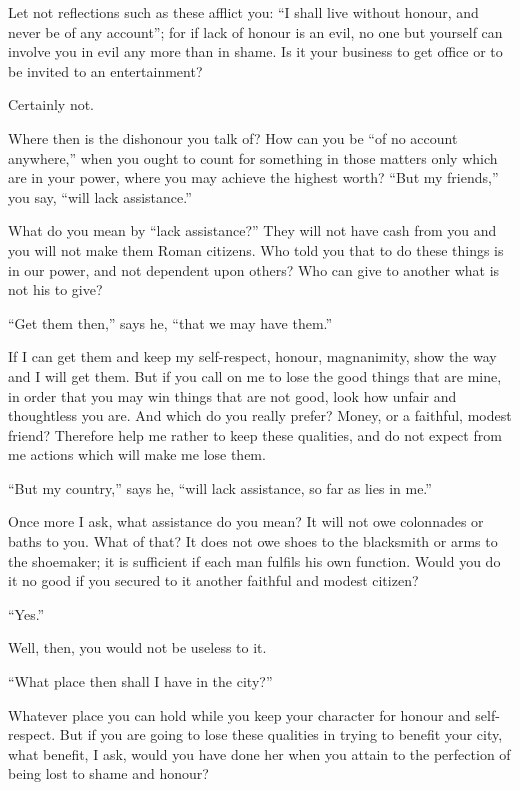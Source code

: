 Let not reflections  such as these afflict you: ``I  shall live without honour,
and never  be of any account'';  for if lack of  honour is an evil,  no one but
yourself can involve you in evil any more than in shame. Is it your business to
get office or to be invited to an entertainment?

Certainly not.

Where  then is  the dishonour  you talk  of?  How can  you be  ``of no  account
anywhere,'' when you  ought to count for something in  those matters only which
are in your power, where you may achieve the highest worth? ``But my friends,''
you say, ``will lack assistance.''

What do you mean  by ``lack assistance?'' They will not have  cash from you and
you will not make them Roman citizens. Who  told you that to do these things is
in our power,  and not dependent upon  others? Who can give to  another what is
not his to give?

``Get them then,'' says he, ``that we may have them.''

If I can get  them and keep my self-respect, honour,  magnanimity, show the way
and I will  get them. But if  you call on me  to lose the good  things that are
mine, in order that  you may win things that are not good,  look how unfair and
thoughtless you  are. And  which do  you really prefer?  Money, or  a faithful,
modest friend?  Therefore help me  rather to keep  these qualities, and  do not
expect from me actions which will make me lose them.

``But my country,'' says he, ``will lack assistance, so far as lies in me.''

Once more  I ask, what assistance  do you mean?  It will not owe  colonnades or
baths to you. What of that? It does  not owe shoes to the blacksmith or arms to
the shoemaker; it is sufficient if each man fulfils his own function. Would you
do it no good if you secured to it another faithful and modest citizen?

``Yes.''

Well, then, you would not be useless to it.

``What place then shall I have in the city?''

Whatever  place you  can hold  while  you keep  your character  for honour  and
self-respect. But if you are going to lose these qualities in trying to benefit
your city, what benefit, I ask, would you  have done her when you attain to the
perfection of being lost to shame and honour?
